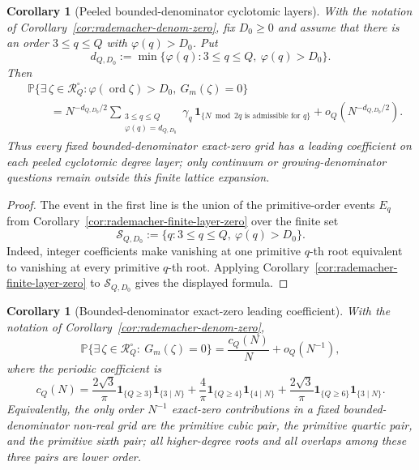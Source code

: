 \documentclass[11pt]{amsart}
\numberwithin{equation}{section}
\newtheorem{corollary}[theorem]{Corollary}
\theoremstyle{definition}
\theoremstyle{remark}
\newcommand{\Prob}{\mathbb P}
\begin{document}
\begin{corollary}[Peeled bounded-denominator cyclotomic layers]
\label{cor:rademacher-denom-zero-layer}
With the notation of Corollary~\ref{cor:rademacher-denom-zero}, fix \(D_0\ge0\)
and assume that there is an order \(3\le q\le Q\) with
\(\varphi(q)>D_0\).  Put
\[
  d_{Q,D_0}:=\min\{\varphi(q):3\le q\le Q,\ \varphi(q)>D_0\}.
\]
Then
\[
\begin{aligned}
&\Prob\{\exists\,\zeta\in\mathcal R_Q^\circ:
     \varphi(\operatorname{ord}\zeta)>D_0,\ G_m(\zeta)=0\} \\
&\qquad =
N^{-d_{Q,D_0}/2}
  \sum_{\substack{3\le q\le Q\\ \varphi(q)=d_{Q,D_0}}}
    \gamma_q\,\mathbf1_{\{N\bmod 2q\text{ is admissible for }q\}}
  +o_Q(N^{-d_{Q,D_0}/2}).
\end{aligned}
\]
Thus every fixed bounded-denominator exact-zero grid has a leading coefficient
on each peeled cyclotomic degree layer; only continuum or growing-denominator
questions remain outside this finite lattice expansion.
\end{corollary}

\begin{proof}
The event in the first line is the union of the primitive-order events \(E_q\)
from Corollary~\ref{cor:rademacher-finite-layer-zero} over the finite set
\[
  \mathcal S_{Q,D_0}:=\{q:3\le q\le Q,\ \varphi(q)>D_0\}.
\]
Indeed, integer coefficients make vanishing at one primitive \(q\)-th root
equivalent to vanishing at every primitive \(q\)-th root.  Applying
Corollary~\ref{cor:rademacher-finite-layer-zero} to \(\mathcal S_{Q,D_0}\)
gives the displayed formula.
\end{proof}

\begin{corollary}[Bounded-denominator exact-zero leading coefficient]
\label{cor:rademacher-denom-zero-leading}
With the notation of Corollary~\ref{cor:rademacher-denom-zero},
\[
  \Prob\{\exists\,\zeta\in\mathcal R_Q^\circ:\ G_m(\zeta)=0\}
  =\frac{c_Q(N)}{N}+o_Q(N^{-1}),
\]
where the periodic coefficient is
\[
  c_Q(N)=
  \frac{2\sqrt3}{\pi}\mathbf1_{\{Q\ge3\}}\mathbf1_{\{3\mid N\}}
  +\frac4\pi\mathbf1_{\{Q\ge4\}}\mathbf1_{\{4\mid N\}}
  +\frac{2\sqrt3}{\pi}\mathbf1_{\{Q\ge6\}}\mathbf1_{\{3\mid N\}} .
\]
Equivalently, the only order \(N^{-1}\) exact-zero contributions in a fixed
bounded-denominator non-real grid are the primitive cubic pair, the primitive
quartic pair, and the primitive sixth pair; all higher-degree roots and all
overlaps among these three pairs are lower order.
\end{corollary}
\end{document}
